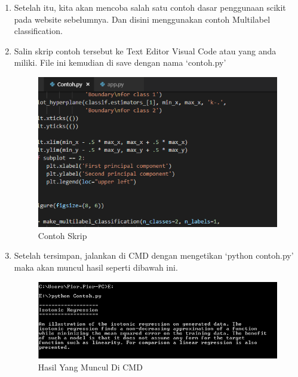 \begin{enumerate}
\item Setelah itu, kita akan mencoba salah satu contoh dasar penggunaan scikit pada website sebelumnya. Dan disini menggunakan contoh Multilabel classification.
\item Salin skrip contoh tersebut ke Text Editor Visual Code atau yang anda miliki. File ini kemudian di save dengan nama `contoh.py'
\begin{figure}
	\begin{center}
   	 \includegraphics[scale=0.5]{figures/contoh.png}
   	 \caption{Contoh Skrip}	
	\end{center}
\end{figure}
\item Setelah tersimpan, jalankan di CMD dengan mengetikan `python contoh.py' maka akan muncul hasil seperti dibawah ini.
\begin{figure}
	\begin{center}
   	 \includegraphics[scale=0.5]{figures/hasil1.png}
   	 \caption{Hasil Yang Muncul Di CMD}	
	\end{center}
\end{figure}


\end{enumerate}
